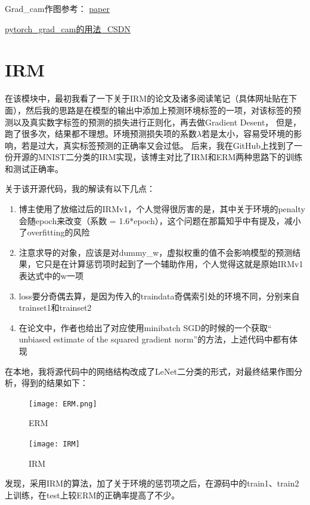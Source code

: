 \documentclass[12pt, a4paper, oneside]{ctexart}
\begin{document}
Grad\_cam作图参考：
\href{https://arxiv.org/pdf/1610.02391v1}{paper}

\href{https://blog.csdn.net/qq_24211837/article/details/134263849}{pytorch\_grad\_cam的用法\_CSDN}

\section{IRM}

在该模块中，最初我看了一下关于IRM的论文及诸多阅读笔记（具体网址贴在下面），然后我的思路是在模型的输出中添加上预测环境标签的一项，对该标签的预测以及真实数字标签的预测的损失进行正则化，再去做Gradient Desent，
但是，跑了很多次，结果都不理想。环境预测损失项的系数$\lambda$若是太小，容易受环境的影响，若是过大，真实标签预测的正确率又会过低。
后来，我在GitHub上找到了一份开源的MNIST二分类的IRM实现，该博主对比了IRM和ERM两种思路下的训练和测试正确率。

关于该开源代码，我的解读有以下几点：
\begin{enumerate}
    \item 博主使用了放缩过后的IRMv1，个人觉得很厉害的是，其中关于环境的penalty会随epoch来改变（系数 = 1.6*epoch），这个问题在那篇知乎中有提及，减小了overfitting的风险
    \item 注意求导的对象，应该是对dummy\_w，虚拟权重的值不会影响模型的预测结果，它只是在计算惩罚项时起到了一个辅助作用，个人觉得这就是原始IRMv1表达式中的w一项
    \item loss要分奇偶去算，是因为传入的traindata奇偶索引处的环境不同，分别来自trainset1和trainset2
    \item 在论文中，作者也给出了对应使用minibatch SGD的时候的一个获取“ unbiased estimate of the squared gradient norm”的方法，上述代码中都有体现
\end{enumerate}

在本地，我将源代码中的网络结构改成了LeNet二分类的形式，对最终结果作图分析，得到的结果如下：
\begin{figure}[H]  
    \begin{minipage}[H]{0.5\linewidth} %
            \centering
            \texttt{[image: ERM.png]}
            \caption{ERM}
     \end{minipage}
     \begin{minipage}[H]{0.5\linewidth} %
         \hspace{2mm}%
         \texttt{[image: IRM]}
         \caption{IRM}
      \end{minipage}
\end{figure}
发现，采用IRM的算法，加了关于环境的惩罚项之后，在源码中的train1、train2上训练，在test上较ERM的正确率提高了不少。
\end{document}
